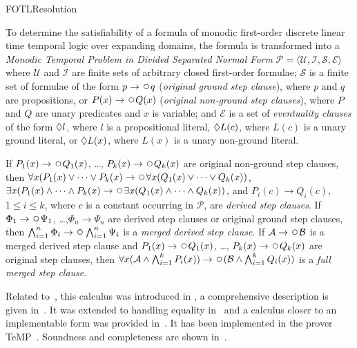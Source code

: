 \begin{entry}{FOTLResolution}
\begin{clarifications}
  To determine the satisfiability of a formula of monodic first-order
  discrete linear time temporal logic over expanding domains, the
  formula is transformed into a \emph{Monodic Temporal Problem
  in Divided Separated Normal Form}
  $\mathcal{P} = \langle \mathcal{U, I, S, E} \rangle$ 
  where $\mathcal{U}$
  and $\mathcal{I}$ 
  are finite sets of arbitrary closed first-order formulae;
  $\mathcal{S}$ 
  is a finite set of formulae of the form
  $p\rightarrow\Next q$ (\emph{original ground step clause}), 
  where $p$ and $q$ are propositions, or
  $P(x)\rightarrow\Next Q(x)$ (\emph{original non-ground step clauses}), 
  where $P$ and $Q$ are unary predicates and $x$ is variable; and
  $\mathcal{E}$  
  is a set of \emph{eventuality clauses}
  of the form $\Diamond l$, where $l$ is a propositional literal,
  $\Diamond L(c)$, where $L(c)$ is a unary ground literal,
  or
  $\Diamond L(x)$, where $L(x)$ is a unary non-ground literal.
  
  If $P_1(x)\rightarrow\Next Q_1(x)$, \dots, $P_k(x)\rightarrow\Next Q_k(x)$ are
  original non-ground step clauses, then
  $\forall x (P_1(x)\lor\dots\lor P_k(x)\rightarrow\Next
   \forall x (Q_1(x)\lor\dots\lor Q_k(x))$,
  $\exists x (P_1(x)\land\dots\land P_k(x)\rightarrow\Next
   \exists x (Q_1(x)\land\dots\land Q_k(x))$, and
  $P_i(c)\rightarrow Q_i(c)$, $1\leq i\leq k$, where $c$ is a constant
  occurring in $\mathcal{P}$, are \emph{derived step clauses}.
  If $\Phi_1\rightarrow\Next\Psi_1$, \dots,$\Phi_n\rightarrow\Psi_n$
  are derived step clauses or original ground step clauses, then
  $\bigwedge_{i=1}^n\Phi_i\rightarrow\Next\bigwedge_{i=1}^n\Psi_i$ is a
  \emph{merged derived step clause}. 
  If $\mathcal{A}\rightarrow\Next\mathcal{B}$ is a merged derived step
  clause and $P_1(x)\rightarrow\Next Q_1(x)$, \dots,
  $P_k(x)\rightarrow\Next Q_k(x)$ are original step clauses,
  then $\forall x (\mathcal{A}\land\bigwedge_{i=1}^k P_i(x))
  \rightarrow\Next (\mathcal{B}\land\bigwedge_{i=1}^k Q_i(x))$
  is a \emph{full merged step clause}.
\end{clarifications}

\begin{history}
  Related to~, this calculus was introduced in
  \cite{Degtyarev+Fisher+Konev@CADE2003},
  a comprehensive description is given
  in~\cite{DBLP:journals/tocl/DegtyarevFK06}. It was 
  extended to handling equality in~\cite{Konev+Degtyarev+Fisher@LPAR2003} 
  and a calculus closer to an implementable form was provided 
  in~\cite{KDDFH05}. It has been implemented in the prover
  TeMP~\cite{DBLP:conf/cade/HustadtKRV04}.
  Soundness and completeness 
  are shown 
  in~\cite{DBLP:journals/tocl/DegtyarevFK06}. 
\end{history}

\end{entry}

